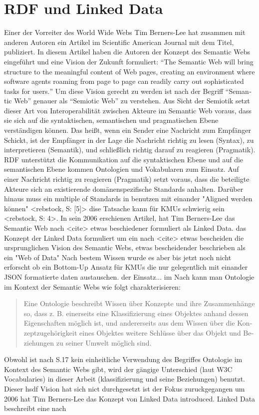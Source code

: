 \section{RDF und Linked Data}
\label{sec:linked-data}

Einer der Vorreiter des World Wide Webs Tim Berners-Lee hat zusammen mit anderen Autoren \citeyear{berners2001semantic} ein Artikel im Scientific American Journal mit dem Titel,  publiziert. In diesem Artikel haben die Autoren der Konzept des Semantic Webs eingeführt und eine Vision der Zukunft formuliert: \hyphenquote{german}{The Semantic Web will bring structure to the meaningful content of Web pages, creating an environment where software agents roaming from page to page can readily carry out sophisticated tasks for users.} Um diese Vision gerecht zu werden ist nach \citeauthor{blumauer2006semantic} der Begriff \hyphenquote{german}{Semantic Web} genauer als \hyphenquote{german}{Semiotic Web} zu verstehen. Aus Sicht der Semiotik setzt dieser Art von Interoperabilität zwischen Akteure im Semantic Web voraus, dass sie sich auf die syntaktischen, semantischen und pragmatischen Ebene verständigen können. Das heißt, wenn ein Sender eine Nachricht zum Empfänger Schickt, ist der Empfänger in der Lage die Nachricht richtig zu lesen (Syntax), zu interpretieren (Semantik), und schließlich richtig darauf zu reagieren (Pragmatik)\parencite[vgl.]{voigtmann2002enterprise}. RDF unterstützt die Kommunikation auf die syntaktischen Ebene und auf die semantischen Ebene kommen Ontologien und Vokabularen zum Einsatz. Auf einer Nachricht richtig zu reagieren (Pragmatik) setzt voraus, dass die beteiligte Akteure sich an existierende domänenspezifische Standards anhalten. Darüber hinaus muss ein multiple of Standards in benutzen mit einander "Aligned werden können" <rebstock, S: [5]> dise Tatsache kann für KMUs schwierig sein <rebstock, S: 4>. In sein 2006 erschienen Artikel, hat Tim Berners-Lee das Semantic Web nach <cite> etwas beschiedener formuliert als Linked Data. das Konzept der Linked Data formuliert um ein nach <cite> etwas bescheiden die ursprunglichen Vision des Semantic Webs, etwas bescheidender beschrieben als ein "Web of Data" Nach bestem Wissen wurde es aber bis jetzt noch nicht erforscht ob ein Bottom-Up Ansatz für KMUs die nur gelegentlich mit einander JSON formatierte daten austauschen.  der Einsatz...   im Nach \citeauthor[S.~488]{may2006semantic} kann man Ontologie im Kontext der Semantic Webs wie folgt charakterisieren: \hyphenblockquote{german}{Eine Ontologie beschreibt Wissen über Konzepte und ihre Zusammenhänge so, dass z. B. einerseits eine Klassifizierung eines Objektes anhand dessen Eigenschaften möglich ist, und andererseits aus dem Wissen über die Konzeptzugehörigkeit eines Objektes weitere Schlüsse über das Objekt und Beziehungen zu seiner Umwelt möglich sind.} Obwohl ist nach S.17 kein einheitliche Verwendung des Begriffes Ontologie im Kontext des Semantic Webs gibt, wird der gängige Unterschied (laut W3C Vocabularies) in dieser Arbeit (klassifizierung und seine Beziehungen) benutzt. Dieser hsdf Vision hat sich nict durchgesetzt ist der Fokus zuruckgegangen um 2006 hat Tim Berners-Lee das Konzept von Linked Data introduced. Linked Data beschreibt eine nach 